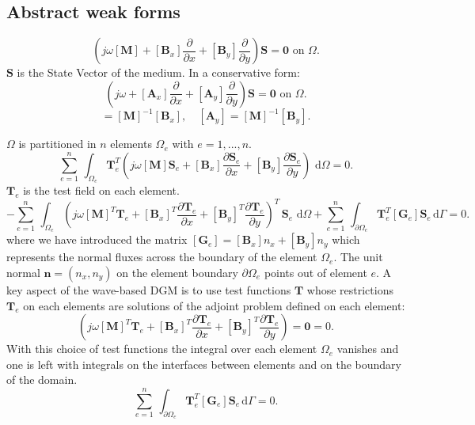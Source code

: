 \documentclass[11pt,A4paper]{book}
\newcommand{\ds}{\displaystyle}
\newcommand{\tb}{\textbf}
\newcommand{\tr}{\textrm}
\newcommand{\tp}{^T}
\newcommand{\esp}{, \quad}
\newcommand{\p}{\partial}
\renewcommand{\d}{\,\textrm{d}}
\renewcommand{\:}{\tb{:}}
\begin{document}
\subsection{Abstract weak forms}
\begin{equation}
\left(j\omega[\tb{M}]+[\tb{B}_x]\dfrac{\p}{\p x}+[\tb{B}_y]\dfrac{\p}{\p y}\right)\tb{S}=\tb{0} \tr{ on } \Omega.
\label{eq:System}
\end{equation}
$\tb{S}$ is the State Vector of the medium. 
In a conservative form:
\begin{equation}
\left(j\omega+[\tb{A}_x]\dfrac{\p}{\p x}+[\tb{A}_y]\dfrac{\p}{\p y}\right)\tb{S}=\tb{0} \tr{ on } \Omega.
\label{eq:System}
\end{equation}
\begin{equation}
	[\tb{A}_x]=[\tb{M}]^{-1}[\tb{B}_x] \esp
	[\tb{A}_y]=[\tb{M}]^{-1}[\tb{B}_y]. 
\end{equation}


$\Omega$ is partitioned in $n$ elements $\Omega_e$ with $e=1,...,n$.
\begin{equation}
\ds{\sum_{e=1}^n}\,
\ds{\int_{\Omega_e}}\tb{T}_e\tp\left(j\omega[\tb{M}]\tb{S}_e+[\tb{B}_x]\dfrac{\p\tb{S}_e}{\p x}+[\tb{B}_y]\dfrac{\p\tb{S}_e}{\p y}\right) \, \d\Omega={0}. 
\label{eq:System}
\end{equation}
$\tb{T}_e$ is the test field on each element.
\begin{equation*}
-\ds{\sum_{e=1}^n}\,\ds{\int_{\Omega_e}}
\left(j\omega[\tb{M}]\tp\tb{T}_e+[\tb{B}_x]\tp\dfrac{\p \tb{T}_e}{\p x}+[\tb{B}_y]\tp\dfrac{\p\tb{T}_e}{\p y}\right)\tp\, \tb{S}_e\, \d\Omega+\ds{\sum_{e=1}^n}\,\ds{\int_{\p\Omega_e}} 
\tb{T}_e\tp[\tb{G}_e]\tb{S}_e \d\Gamma
={0}. 
\end{equation*}
where we have introduced the matrix $[\tb{G}_e]=[\tb{B}_x]n_x + [\tb{B}_y]n_y$ which represents the normal fluxes across the boundary of the element $\Omega_e$. The unit normal $\tb{n} = (n_x,n_y)$ on the element boundary $\p\Omega_e$ points out of element $e$. A key aspect of the wave-based DGM is to use test functions $\tb{T}$ whose restrictions $\tb{T}_e$ on each elements are solutions of the adjoint problem defined on each element:
\begin{equation}
\left(j\omega[\tb{M}]\tp\tb{T}_e+[\tb{B}_x]\tp\dfrac{\p \tb{T}_e}{\p x}+[\tb{B}_y]\tp\dfrac{\p\tb{T}_e}{\p y}\right)=\tb{0}
={0}. 
\end{equation}
With this choice of test functions the integral over each element $\Omega_e$ vanishes and one is left with integrals on the interfaces between elements and on the boundary of the domain.
\begin{equation}
\ds{\sum_{e=1}^n}\,\ds{\int_{\p\Omega_e}} 
\tb{T}_e\tp[\tb{G}_e]\tb{S}_e \d\Gamma
={0}. 
\end{equation}
\end{document}
